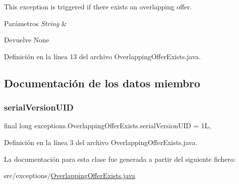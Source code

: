 This exception is triggered if there exists an overlapping offer. 


\begin{DoxyParams}{Parámetros}
{\em String} & \\
\hline
\end{DoxyParams}
\begin{DoxyReturn}{Devuelve}
None 
\end{DoxyReturn}


Definición en la línea 13 del archivo Overlapping\+Offer\+Exists.\+java.


\begin{DoxyCode}{0}

\end{DoxyCode}


\subsection{Documentación de los datos miembro}
\mbox{\label{classexceptions_1_1_overlapping_offer_exists_ab47bd08f41ac7a43204806e53aa1538a}} 
\subsubsection{\texorpdfstring{serialVersionUID}{serialVersionUID}}
{\footnotesize\ttfamily final long exceptions.\+Overlapping\+Offer\+Exists.\+serial\+Version\+U\+ID = 1L\hspace{0.3cm}{\ttfamily [static]}, {\ttfamily [private]}}



Definición en la línea 3 del archivo Overlapping\+Offer\+Exists.\+java.



La documentación para esta clase fue generada a partir del siguiente fichero\+:\begin{DoxyCompactItemize}
\item 
src/exceptions/\mbox{\hyperlink{_overlapping_offer_exists_8java}{Overlapping\+Offer\+Exists.\+java}}\end{DoxyCompactItemize}

